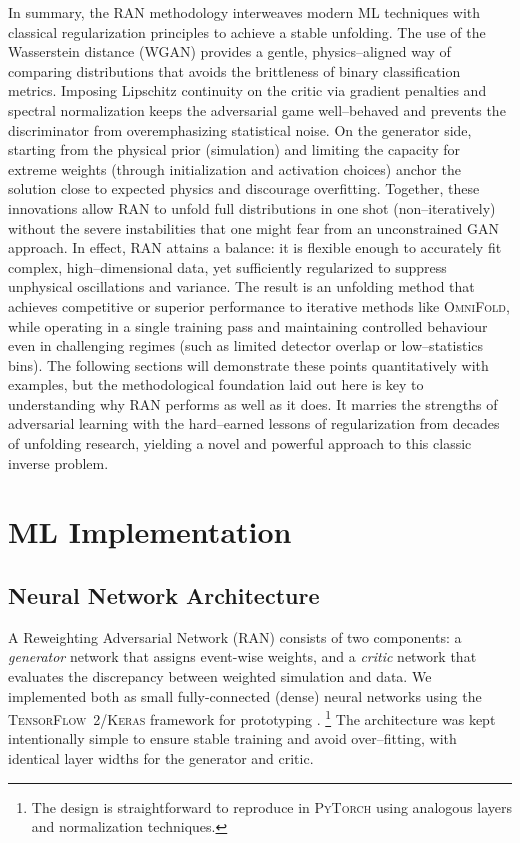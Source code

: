     In summary, the RAN methodology interweaves modern ML techniques with classical regularization principles to achieve a stable unfolding.
    The use of the Wasserstein distance (WGAN) provides a gentle, physics--aligned way of comparing distributions that avoids the brittleness of binary classification metrics.
    Imposing Lipschitz continuity on the critic via gradient penalties and spectral normalization keeps the adversarial game well--behaved and prevents the discriminator from overemphasizing statistical noise.
    On the generator side, starting from the physical prior (simulation) and limiting the capacity for extreme weights (through initialization and activation choices) anchor the solution close to expected physics and discourage overfitting.
    Together, these innovations allow RAN to unfold full distributions in one shot (non--iteratively) without the severe instabilities that one might fear from an unconstrained GAN approach.
    In effect, RAN attains a balance: it is flexible enough to accurately fit complex, high--dimensional data, yet sufficiently regularized to suppress unphysical oscillations and variance.
    The result is an unfolding method that achieves competitive or superior performance to iterative methods like \textsc{OmniFold}, while operating in a single training pass and maintaining controlled behaviour even in challenging regimes (such as limited detector overlap or low--statistics bins).
    The following sections will demonstrate these points quantitatively with examples, but the methodological foundation laid out here is key to understanding why RAN performs as well as it does.
    It marries the strengths of adversarial learning with the hard--earned lessons of regularization from decades of unfolding research, yielding a novel and powerful approach to this classic inverse problem.
\section{ML Implementation}
    \subsection{Neural Network Architecture}
        A Reweighting Adversarial Network (RAN) consists of two components: a \emph{generator} network that assigns event-wise weights, and a \emph{critic} network that evaluates the discrepancy between weighted simulation and data.
        We implemented both as small fully-connected (dense) neural networks using the \textsc{TensorFlow~2/Keras} framework for prototyping .
        \footnote{The design is straightforward to reproduce in \textsc{PyTorch} using analogous layers and normalization techniques.}
        The architecture was kept intentionally simple to ensure stable training and avoid over--fitting, with identical layer widths for the generator and critic.

